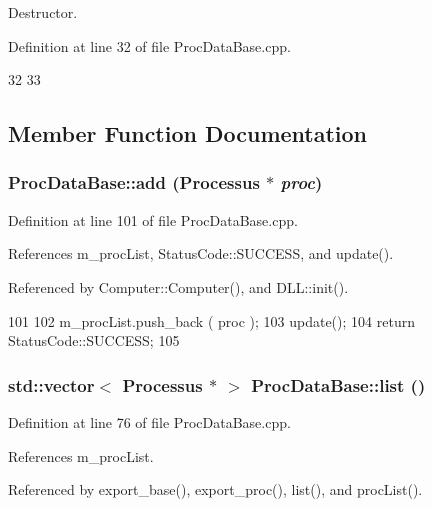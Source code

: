 Destructor. 

Definition at line 32 of file ProcDataBase.cpp.


\begin{DoxyCode}
32                             {
33 }
\end{DoxyCode}


\subsection{Member Function Documentation}
\hypertarget{classProcDataBase_a0aafeb65a41b92a6d1fdd67f363ef826}{
\subsubsection[{add}]{ ProcDataBase::add ({\bf Processus} $\ast$ {\em proc})}}
\label{classProcDataBase_a0aafeb65a41b92a6d1fdd67f363ef826}


Definition at line 101 of file ProcDataBase.cpp.

References m\_\-procList, StatusCode::SUCCESS, and update().

Referenced by Computer::Computer(), and DLL::init().


\begin{DoxyCode}
101                                                {
102   m_procList.push_back ( proc );
103   update();
104   return StatusCode::SUCCESS;
105 }
\end{DoxyCode}
\hypertarget{classProcDataBase_a813dbc8f9e7c4d69074a01394f04fc98}{
\subsubsection[{list}]{\setlength{\rightskip}{0pt plus 5cm}std::vector$<$ {\bf Processus} $\ast$ $>$ ProcDataBase::list ()}}
\label{classProcDataBase_a813dbc8f9e7c4d69074a01394f04fc98}


Definition at line 76 of file ProcDataBase.cpp.

References m\_\-procList.

Referenced by export\_\-base(), export\_\-proc(), list(), and procList().


